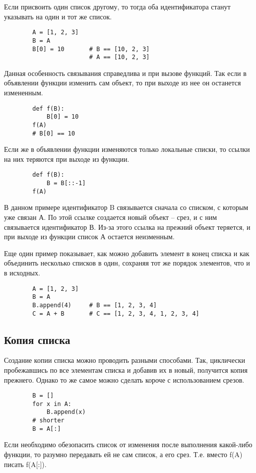 \documentclass[a4paper, fleqn]{article}
\begin{document}
	Если присвоить один список другому, то тогда оба идентификатора станут указывать на один и тот же список.
	\begin{lstlisting}
		A = [1, 2, 3]
		B = A
		B[0] = 10		# B == [10, 2, 3] 
						# A == [10, 2, 3]
	\end{lstlisting}
	
	Данная особенность связывания справедлива и при вызове функций. Так если в объявлении функции изменить сам объект, то при выходе из нее он останется измененным.
	\begin{lstlisting}
		def f(B):
			B[0] = 10
		f(A)
		# B[0] == 10
	\end{lstlisting}
	Если же в объявлении функции изменяются только локальные списки, то ссылки на них теряются при выходе из функции. 
	\begin{lstlisting}
		def f(B):
			B = B[::-1]
		f(A)
	\end{lstlisting}
	В данном примере идентификатор B связывается сначала со списком, с которым уже связан А. По этой ссылке создается новый объект -- срез, и с ним связывается идентификатор В. Из-за этого ссылка на прежний объект теряется, и при выходе из функции список А остается неизменным.
	
	Еще один пример показывает, как можно добавить элемент в конец списка и как объединить несколько списков в один, сохраняя тот же порядок элементов, что и в исходных. 
	\begin{lstlisting}
		A = [1, 2, 3]
		B = A
		B.append(4)		# B == [1, 2, 3, 4]
		C = A + B		# C == [1, 2, 3, 4, 1, 2, 3, 4]
	\end{lstlisting}
	
	\subsection*{Копия списка}
	
	Создание копии списка можно проводить разными способами. Так, циклически пробежавшись по все элементам списка и добавив их в новый, получится копия прежнего. Однако то же самое можно сделать короче с использованием срезов.  
	\begin{lstlisting}
		B = []
		for x in A:
			B.append(x)
		# shorter
		B = A[:]
	\end{lstlisting}
	
	Если необходимо обезопасить список от изменения после выполнения какой-либо функции, то разумно передавать ей не сам список, а его срез.
	Т.е. вместо f(A) писать f(A[:]).
	
	
	
\end{document}
